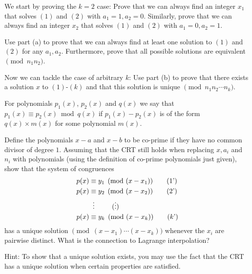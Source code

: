 \documentclass[11pt]{article}
\begin{document}
\begin{Parts}
\Part We start by proving the $k=2$ case: Prove that we can always find an integer $x_1$
that solves $(1)$ and $(2)$ with $a_1 = 1, a_2 = 0$. Similarly, prove that we can always
find an integer $x_2$ that solves $(1)$ and $(2)$ with $a_1 = 0, a_2 = 1$.

\Part Use part (a) to prove that we can always find at least one solution to $(1)$ and $(2)$ for any $a_1,a_2$. Furthermore, prove that all possible solutions are equivalent
$\pmod{n_1n_2}$.

\Part Now we can tackle the case of arbitrary $k$: Use part (b) to prove that there exists
a solution $x$ to $(1)$-$(k)$ and that this solution is unique $\pmod{n_1 n_2 \cdots n_k}$.

\Part For polynomials $p_1 (x)$, $p_2 (x)$ and $q(x)$ we say that $p_1(x) \equiv p_2 (x) \bmod{q(x)}$ if $p_1 (x) - p_2 (x)$ is of the form $q (x) \times m(x)$ for some polynomial $m(x)$.

Define the polynomials $x-a$ and $x-b$ to be co-prime if they have no common divisor
of degree $1$. Assuming that the CRT still holds when replacing $x, a_i$ and $n_i$ with
polynomials (using the definition of co-prime polynomials just given), show that the system
of congruences
\begin{align}
    p(x) & \equiv y_1 \pmod{(x-x_1)} \tag{1'} \\
    p(x) & \equiv y_2 \pmod{(x-x_2)} \tag{2'} \\
    &\vdotswithin{\equiv} \tag{$\vdots$} \\
    p(x) & \equiv y_k \pmod{(x-x_k)} \tag{$k$'}
\end{align}
has a unique solution $\pmod{(x-x_1)\cdots(x-x_k)}$ whenever the $x_i$ are pairwise
distinct. What is the connection to Lagrange interpolation?

Hint: To show that a unique solution exists, you may use the fact that the CRT has a unique solution when certain properties are satisfied.

\end{Parts}
\end{document}
